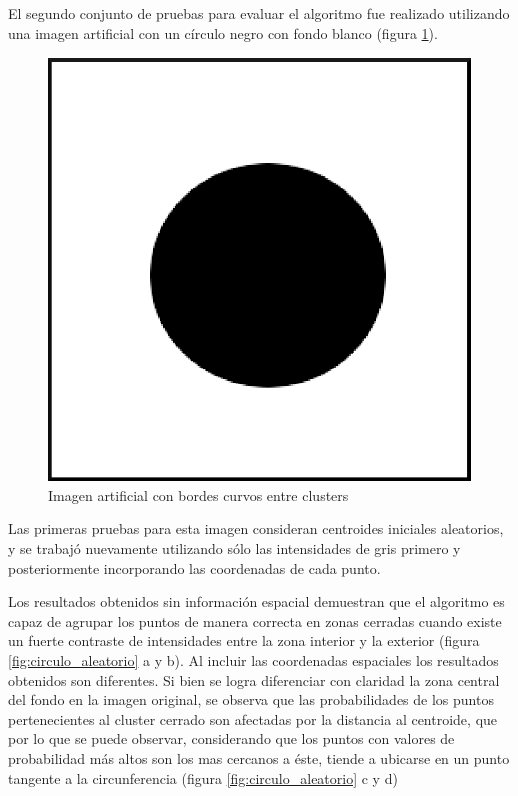 El segundo conjunto de pruebas para evaluar el algoritmo fue realizado utilizando una imagen artificial con un círculo negro con fondo blanco  (figura \ref{fig:circulo}).

\begin{figure}[H]
\centering
\includegraphics[scale=0.3]{images/circulo_250x250.eps}
\caption{Imagen artificial con bordes curvos entre clusters}
\label{fig:circulo}
\end{figure}

Las primeras pruebas para esta imagen consideran centroides iniciales aleatorios, y se trabajó nuevamente utilizando sólo las intensidades de gris primero y posteriormente incorporando las coordenadas de cada punto.

Los resultados obtenidos sin información espacial demuestran que el algoritmo es capaz de agrupar los puntos de manera correcta en zonas cerradas cuando existe un fuerte contraste de intensidades entre la zona interior y la exterior (figura \ref{fig:circulo_aleatorio} a y b). Al incluir las coordenadas espaciales los resultados obtenidos son diferentes. Si bien se logra diferenciar con claridad la zona central del fondo en la imagen original, se observa que las probabilidades de los puntos pertenecientes al cluster cerrado son afectadas por la distancia al centroide, que por lo que se puede observar, considerando que los puntos con valores de probabilidad más altos son los mas cercanos a éste, tiende a ubicarse en un punto tangente a la circunferencia (figura \ref{fig:circulo_aleatorio} c y d)

